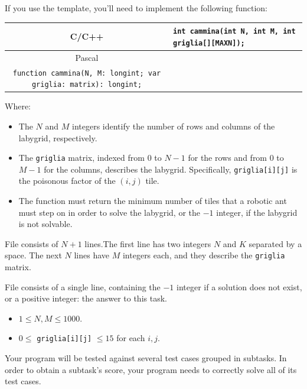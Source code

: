 If you use the template, you'll need to implement the following function:
\begin{center}\begin{tabularx}{\textwidth}{|c|X|}
\hline
C/C++  & \verb|int cammina(int N, int M, int griglia[][MAXN]);|\\
\hline
Pascal & \begin{tabular}[x]{@{}@{}}\verb|type matrix = array of array of longint;|\\ \verb|function cammina(N, M: longint; var griglia: matrix): longint;|\end{tabular}\\
\hline
\end{tabularx}\end{center}
Where:
\begin{itemize}[nolistsep]
  \item The $N$ and $M$ integers identify the number of rows and columns of the labygrid, respectively.
  \item The \texttt{griglia} matrix, indexed from $0$ to $N-1$ for the rows and from $0$ to $M-1$ for the columns, describes the labygrid. Specifically, \texttt{griglia[i][j]} is the poisonous factor of the $(i, j)$ tile.
  \item The function must return the minimum number of tiles that a robotic ant must step on in order to solve the labygrid, or the $-1$ integer, if the labygrid is not solvable.
\end{itemize}

\InputFile
File  consists of $N+1$ lines.The first line has two integers $N$ and $K$ separated by a space. The next $N$ lines have $M$ integers each, and they describe the \texttt{griglia} matrix.

\OutputFile
File \outputfile{} consists of a single line, containing the $-1$ integer if a solution does not exist, or a positive integer: the answer to this task.

\Constraints
\begin{itemize}[nolistsep, itemsep=2mm]
	\item $1 \le N, M \le 1000$.
	\item $0 \le$ \texttt{griglia[i][j]} $\le 15$ for each $i, j$.
\end{itemize}

\Scoring
Your program will be tested against several test cases grouped in subtasks.
In order to obtain a subtask's score, your program needs to correctly solve all of its test cases.

